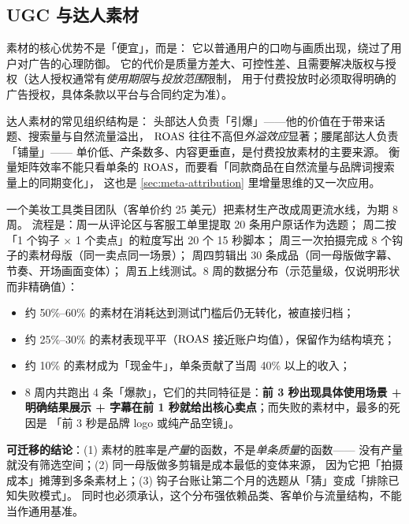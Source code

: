 \subsection{UGC 与达人素材}

素材的核心优势不是「便宜」，而是：
它以普通用户的口吻与画质出现，绕过了用户对广告的心理防御。
它的代价是质量方差大、可控性差、且需要解决版权与授权（达人授权通常有\emph{使用期限}与\emph{投放范围}限制，
用于付费投放时必须取得明确的广告授权，具体条款以平台与合同约定为准）。

达人素材的常见组织结构是：
头部达人负责「引爆」——他的价值在于带来话题、搜索量与自然流量溢出，
$\operatorname{ROAS}$ 往往不高但\emph{外溢效应}显著；腰尾部达人负责「铺量」——
单价低、产条数多、内容更垂直，是付费投放素材的主要来源。
衡量矩阵效率不能只看单条的 $\operatorname{ROAS}$，而要看「同款商品在自然流量与品牌词搜索量上的同期变化」，
这也是 \cref{sec:meta-attribution} 里增量思维的又一次应用。

\begin{casebox}
一个美妆工具类目团队（客单价约 25 美元）把素材生产改成周更流水线，为期 8 周。
流程是：周一从评论区与客服工单里提取 20 条用户原话作为选题；
周二按「1 个钩子 $\times$ 1 个卖点」的粒度写出 20 个 15 秒脚本；
周三一次拍摄完成 8 个钩子的素材母版（同一卖点同一场景）；
周四剪辑出 30 条成品（同一母版做字幕、节奏、开场画面变体）；
周五上线测试。8 周的数据分布（示范量级，仅说明形状而非精确值）：

\begin{itemize}
  \item 约 50\%--60\% 的素材在消耗达到测试门槛后仍无转化，被直接归档；
  \item 约 25\%--30\% 的素材表现平平（$\operatorname{ROAS}$ 接近账户均值），保留作为结构填充；
  \item 约 10\% 的素材成为「现金牛」，单条贡献了当周 40\% 以上的收入；
  \item 8 周内共跑出 4 条「爆款」，它们的共同特征是：\textbf{前 3 秒出现具体使用场景 + 明确结果展示 +
        字幕在前 1 秒就给出核心卖点}；而失败的素材中，最多的死因是
        「前 3 秒是品牌 logo 或纯产品空镜」。
\end{itemize}

\textbf{可迁移的结论}：(1) 素材的胜率是\emph{产量}的函数，不是\emph{单条质量}的函数——
没有产量就没有筛选空间；(2) 同一母版做多剪辑是成本最低的变体来源，
因为它把「拍摄成本」摊薄到多条素材上；(3) 钩子台账让第二个月的选题从「猜」变成「排除已知失败模式」。
同时也必须承认，这个分布强依赖品类、客单价与流量结构，不能当作通用基准。
\end{casebox}


